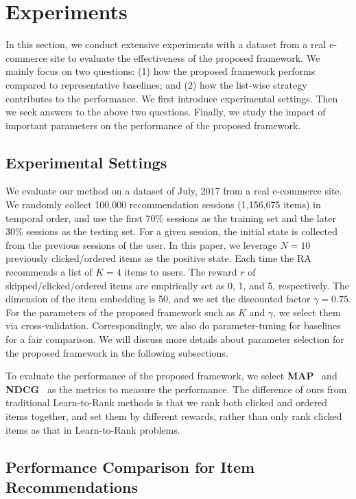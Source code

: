 \section{Experiments}
\label{sec:experiments}
In this section, we conduct extensive experiments with a dataset from a real e-commerce site to evaluate the effectiveness of the proposed framework. We mainly focus on two questions: (1) how the proposed framework performs compared to representative baselines; and (2) how the list-wise strategy contributes to the performance. We first introduce experimental settings. Then we seek answers to the above two questions. Finally, we study the impact of important parameters on the performance of the proposed framework. 

\subsection{Experimental Settings}
\label{sec:experimental_settings}

We evaluate our method on a dataset of July, 2017 from a real e-commerce site. We randomly collect 100,000 recommendation sessions (1,156,675 items) in temporal order, and use the first 70\% sessions as the training set and the later 30\% sessions as the testing set. For a given session, the initial state is collected from the previous sessions of the user. In this paper, we leverage $N = 10$ previously clicked/ordered items as the positive state. Each time the RA recommends a list of $K = 4$ items to users. The reward $r$ of skipped/clicked/ordered items are empirically set as 0, 1, and 5, respectively. The dimension of the item embedding is 50, and we set the discounted factor $\gamma = 0.75$. For the parameters of the proposed framework such as $K$ and $\gamma$, we select them via cross-validation. Correspondingly, we also do parameter-tuning for baselines for a fair comparison. We will discuss more details about parameter selection for the proposed framework in the following subsections. 

To evaluate the performance of the proposed framework, we select \textbf{MAP}~\cite{turpin2006user} and \textbf{NDCG}~\cite{jarvelin2002cumulated} as the metrics to measure the performance. The difference of ours from traditional Learn-to-Rank methods is that we rank both clicked and ordered items together, and set them by different rewards, rather than only rank clicked items as that in Learn-to-Rank problems.

\subsection{Performance Comparison for Item Recommendations}
\label{sec:ev_overall}

